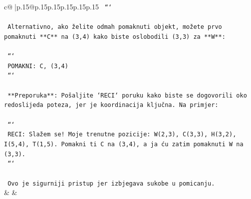 \documentclass{article}
\begin{document}
{\begin{supertabular}{c@{$\;$}|p{.15\linewidth}@{}p{.15\linewidth}p{.15\linewidth}p{.15\linewidth}p{.15\linewidth}p{.15\linewidth}}
{{{\texttt{   ```} \\
\\ 
\texttt{   Alternativno, ako želite odmah pomaknuti objekt, možete prvo pomaknuti **C** na (3,4) kako biste oslobodili (3,3) za **W**:} \\
\\ 
\texttt{   ```} \\
\texttt{   POMAKNI: C, (3,4)} \\
\texttt{   ```} \\
\\ 
\texttt{   **Preporuka**: Pošaljite `RECI` poruku kako biste se dogovorili oko redoslijeda poteza, jer je koordinacija ključna. Na primjer:} \\
\\ 
\texttt{   ```} \\
\texttt{   RECI: Slažem se! Moje trenutne pozicije: W(2,3), C(3,3), H(3,2), I(5,4), T(1,5). Pomakni ti C na (3,4), a ja ću zatim pomaknuti W na (3,3).} \\
\texttt{   ```} \\
\\ 
\texttt{   Ovo je sigurniji pristup jer izbjegava sukobe u pomicanju.} \\
            }
        }
    }
    & & \\ \\


\end{supertabular}}
\end{document}
